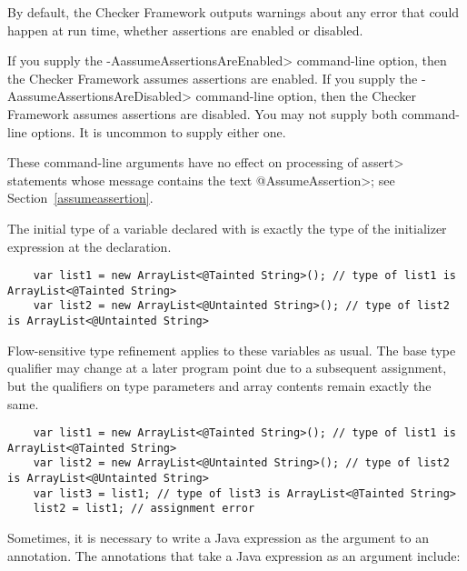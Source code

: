 By default, the Checker Framework outputs warnings about any error that
could happen at run time, whether assertions are enabled or disabled.

If you supply the \<-AassumeAssertionsAreEnabled> command-line option, then
the Checker Framework assumes assertions are enabled.  If you supply the
\<-AassumeAssertionsAreDisabled> command-line option, then the Checker
Framework assumes assertions are disabled.  You may not supply both
command-line options.  It is uncommon to supply either one.

These command-line arguments have no effect on processing of \<assert>
statements whose message contains the text \<@AssumeAssertion>; see
Section~\ref{assumeassertion}.



The initial type of a variable declared with  is exactly
the type of the initializer expression at the declaration.

\begin{Verbatim}
    var list1 = new ArrayList<@Tainted String>(); // type of list1 is ArrayList<@Tainted String>
    var list2 = new ArrayList<@Untainted String>(); // type of list2 is ArrayList<@Untainted String>
\end{Verbatim}

Flow-sensitive type refinement applies to these variables as usual.
The base type qualifier may change at a later program point due to
a subsequent assignment, but the qualifiers on type parameters and
array contents remain exactly the same.

\begin{Verbatim}
    var list1 = new ArrayList<@Tainted String>(); // type of list1 is ArrayList<@Tainted String>
    var list2 = new ArrayList<@Untainted String>(); // type of list2 is ArrayList<@Untainted String>
    var list3 = list1; // type of list3 is ArrayList<@Tainted String>
    list2 = list1; // assignment error
\end{Verbatim}


Sometimes, it is necessary to write a Java expression as the argument to an
annotation.  The annotations that take a Java
expression as an argument include:

